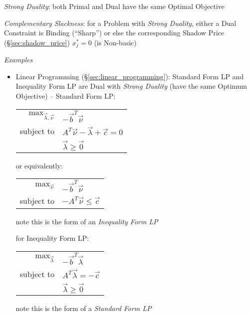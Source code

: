 \emph{Strong Duality}: both Primal and Dual have the same Optimal Objective


\emph{Complementary Slackness}: for a Problem with \emph{Strong Duality},
either a Dual Constraint is Binding (``Sharp'') or else the corresponding
Shadow Price (\S\ref{sec:shadow_price}) $x_j^* = 0$ (is Non-basic)


\emph{Examples}

\begin{itemize}
  \item Linear Programming (\S\ref{sec:linear_programming}): Standard Form LP
    and Inequality Form LP are Dual with \emph{Strong Duality} (have the same
    Optimum Objective) -- Standard Form LP:

    \begin{tabular}{r l}
      $\mathrm{max}_{\vec{\lambda},\vec{\nu}}$ &
        $-\vec{b}^T\vec{\nu}$ \\
      subject to & $A^T\vec{\nu} - \vec{\lambda} + \vec{c} = 0$ \\
                 & $\vec{\lambda} \geq \vec{0}$ \\
    \end{tabular}

    or equivalently:

    \begin{tabular}{r l}
      $\mathrm{max}_{\vec{\nu}}$ &
        $-\vec{b}^T\vec{\nu}$ \\
      subject to & $-A^T\vec{\nu} \leq \vec{c}$ \\
    \end{tabular}

    note this is the form of an \emph{Inequality Form LP}

    for Inequality Form LP:

    \begin{tabular}{r l}
      $\mathrm{max}_{\vec{\lambda}}$ & $-\vec{b}^T\vec{\lambda}$ \\
      subject to & $A^T\vec{\lambda} = -\vec{c}$ \\
                & $\vec{\lambda} \geq \vec{0}$  \\
    \end{tabular}

    note this is the form of a \emph{Standard Form LP}

\end{itemize}



